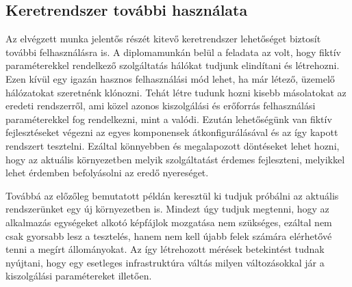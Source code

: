 \subsection{Keretrendszer további használata}
Az elvégzett munka jelentős részét kitevő keretrendszer lehetőséget biztosít további felhasználásra is.
A diplomamunkán belül a feladata az volt, hogy fiktív paraméterekkel rendelkező szolgáltatás hálókat tudjunk elindítani és létrehozni.
Ezen kívül egy igazán hasznos felhasználási mód lehet, ha már létező, üzemelő hálózatokat szeretnénk klónozni.
Tehát létre tudunk hozni kisebb másolatokat az eredeti rendszerről, ami közel azonos kiszolgálási és erőforrás felhasználási paraméterekkel fog rendelkezni, mint a valódi.
Ezután lehetőségünk van fiktív fejlesztéseket végezni az egyes komponensek átkonfigurálásával és az így kapott rendszert tesztelni.
Ezáltal könnyebben és megalapozott döntéseket lehet hozni, hogy az aktuális környezetben melyik szolgáltatást érdemes fejleszteni, melyikkel lehet érdemben befolyásolni az eredő nyereséget.

Továbbá az előzőleg bemutatott példán keresztül ki tudjuk próbálni az aktuális rendszerünket egy új környezetben is.
Mindezt úgy tudjuk megtenni, hogy az alkalmazás egységeket alkotó képfájlok mozgatása nem szükséges, ezáltal nem csak gyorsabb lesz a tesztelés, hanem nem kell újabb felek számára elérhetővé tenni a megírt állományokat.
Az így létrehozott mérések betekintést tudnak nyújtani, hogy egy esetleges infrastruktúra váltás milyen változásokkal jár a kiszolgálási paramétereket illetően.
